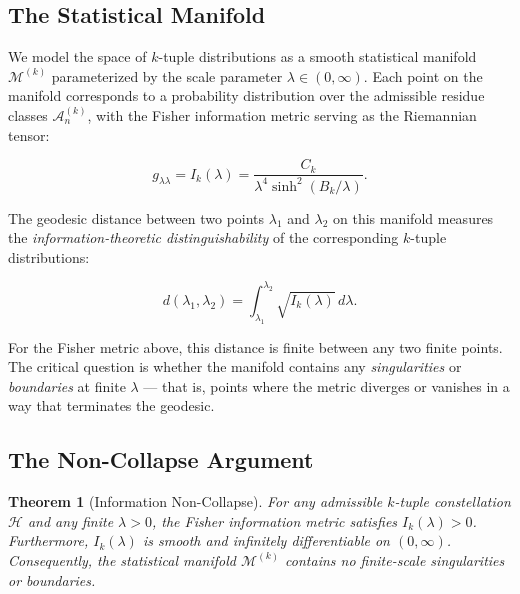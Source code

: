 \documentclass[11pt]{article}
\newtheorem{theorem}{Theorem}[section]
\theoremstyle{remark}
\begin{document}
\subsection{The Statistical Manifold}

We model the space of $k$-tuple distributions as a smooth statistical
manifold $\mathcal{M}^{(k)}$ parameterized by the scale parameter
$\lambda \in (0, \infty)$. Each point on the manifold corresponds to a
probability distribution over the admissible residue classes
$\mathcal{A}_n^{(k)}$, with the Fisher information metric serving as
the Riemannian tensor:

\begin{equation}
g_{\lambda\lambda} = I_k(\lambda) = \frac{C_k}{\lambda^4 \sinh^2(B_k/\lambda)}.
\end{equation}

The geodesic distance between two points $\lambda_1$ and $\lambda_2$ on
this manifold measures the \emph{information-theoretic distinguishability}
of the corresponding $k$-tuple distributions:

\begin{equation}
d(\lambda_1, \lambda_2) = \int_{\lambda_1}^{\lambda_2}
\sqrt{I_k(\lambda)} \, d\lambda.
\end{equation}

For the Fisher metric above, this distance is finite between any two
finite points. The critical question is whether the manifold contains
any \emph{singularities} or \emph{boundaries} at finite $\lambda$ — that
is, points where the metric diverges or vanishes in a way that terminates
the geodesic.

\subsection{The Non-Collapse Argument}

\begin{theorem}[Information Non-Collapse]
\label{thm:non-collapse}
For any admissible $k$-tuple constellation $\mathcal{H}$ and any
finite $\lambda > 0$, the Fisher information metric satisfies
$I_k(\lambda) > 0$. Furthermore, $I_k(\lambda)$ is smooth and
infinitely differentiable on $(0, \infty)$. Consequently, the
statistical manifold $\mathcal{M}^{(k)}$ contains no finite-scale
singularities or boundaries.
\end{theorem}
\end{document}
